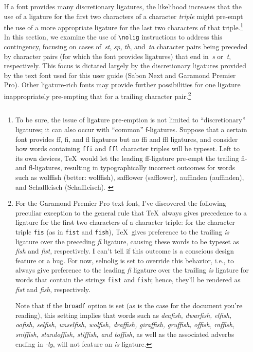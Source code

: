 \documentclass[11pt]{article}
\newcommand{\pkg}[1]{\textsf{#1}}
\newcommand{\opt}[1]{\texttt{#1}}
\newcommand{\cmmd}[1]{\texttt{\textbackslash #1}}
\begin{document}
If a font provides many discretionary ligatures, the likelihood increases that the use of a ligature for the first two characters of a character \emph{triple} might pre-empt the use of a more appropriate ligature for the last two characters of that triple.\footnote{To be sure, the issue of ligature pre-emption is not limited to \enquote{discretionary} ligatures; it can also occur with \enquote{common} f-ligatures. Suppose that a certain font provides ff, fi, and fl ligatures but no ffi and ffl ligatures, and consider how words containing \opt{ffi} and \opt{ffl} character triples will be typeset. Left to its own devices, \TeX\ would let the leading ff-ligature pre-empt the trailing fi- and fl-ligatures, resulting in typographically incorrect outcomes for words such as wol\mbox{ff}ish (better: wolf\mbox{fi}sh), sa\mbox{ff}lower (safflower), au\mbox{ff}inden (auffinden), and Scha\mbox{ff}leisch (Schaffleisch). \label{fn:triple}} 
In this section, we examine the use of \cmmd{nolig} instructions to address this contingency, focusing on cases of~\emph{st}, \emph{sp}, \emph{th}, and~\emph{ta} character pairs being preceded by character pairs (for which the font provides ligatures) that end in~\emph{s} or~\emph{t}, respectively. This focus is dictated largely by the discretionary ligatures provided by the text font used for this user guide (Sabon Next and Garamond Premier Pro). Other ligature-rich fonts may provide further possibilities for one ligature inappropriately pre-empting that for a trailing character pair.\footnote{For the Garamond Premier Pro text font, I've discovered the following preculiar exception to the general rule that \TeX\ always gives precedence to a ligature for the first two characters of a character triple: for the character triple \opt{fis} (as in \opt{fist} and \opt{fish}), \TeX\ gives preference to the trailing \emph{is} ligature over the preceding \emph{fi} ligature, causing these words to be typeset as \emph{f\mbox{is}h} and \emph{f\mbox{is}t}, respectively. I can't tell if this outcome is a conscious design feature or a bug.
For now, \pkg{selnolig} is set to override this behavior, i.e., to always give preference to the leading \emph{fi} ligature over the trailing \emph{is} ligature for words that contain the strings \opt{fist} and \opt{fish}; hence, they'll be rendered as \emph{fist} and \emph{fish}, respectively. 

Note that if the \opt{broadf} option is set (as is the case for the document you're reading), this setting implies that words such as \emph{deafish, dwarfish, elfish, oafish, selfish, unselfish, wolfish, draffish, giraffish, gruffish, offish, raffish, sniffish, standoffish, stiffish, \emph{and} toffish}, as well as the associated adverbs ending in \emph{-ly}, will not feature an \emph{is} ligature.}
\end{document}

